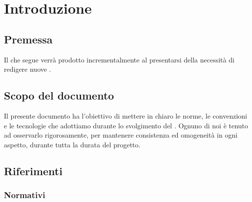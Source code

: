 \section{Introduzione} \label{Introduzione}

    

    \subsection{Premessa}
    Il  che segue verrà prodotto incrementalmente al presentarsi della necessità di redigere nuove .

    \subsection{Scopo del documento}
    Il presente documento ha l’obiettivo di mettere in chiaro le norme, le convenzioni e le tecnologie che adottiamo durante lo svolgimento del .
    Ognuno di noi \`e tenuto ad osservarlo rigorosamente, per mantenere consistenza ed omogeneit\`a in ogni aspetto, durante tutta la durata del progetto.

    


\subsection{Riferimenti}\label{Riferimenti}

    \subsubsection{Normativi}	\label{rifnorma}


